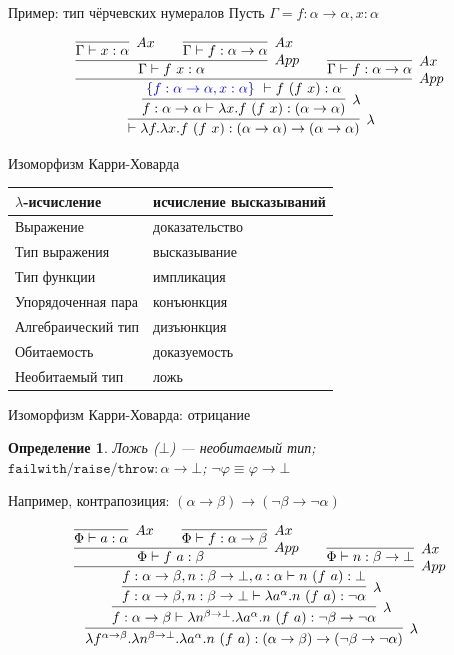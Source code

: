 \documentclass[aspectratio=169]{beamer}
\newtheorem{dfn}{Определение}[section]
\begin{document}
\begin{frame}{Пример: тип чёрчевских нумералов}
Пусть $\Gamma = f:\alpha\rightarrow\alpha, x: \alpha$

$$\infer[\lambda]{\vdash \lambda f.\lambda x.f\ (f\ x) : (\alpha\rightarrow\alpha)\rightarrow(\alpha\rightarrow\alpha)}{
  \infer[\lambda]{f: \alpha\rightarrow\alpha \vdash \lambda x.f\ (f\ x) : (\alpha\rightarrow\alpha)}{
    \infer[App]{{\color{blue}\{ f:\alpha\rightarrow\alpha, x: \alpha\}\ } \vdash f\ (f\ x): \alpha}{
      \infer[App]{\Gamma \vdash f\ x: \alpha}{
        \infer[Ax]{\Gamma \vdash x: \alpha}{}\quad\quad\infer[Ax]{\Gamma \vdash f: \alpha\rightarrow\alpha}{}
      }\quad\quad
      \infer[Ax]{\Gamma \vdash f: \alpha\rightarrow\alpha}{}
    }
  }
}$$
\end{frame}


\begin{frame}{Изоморфизм Карри-Ховарда}

\begin{tabular}{ll}
$\lambda$-исчисление & исчисление высказываний\\\hline
Выражение & доказательство\\
Тип выражения & высказывание\\
Тип функции & импликация\\
Упорядоченная пара & конъюнкция\\
Алгебраический тип & дизъюнкция\\
Обитаемость & доказуемость\\
Необитаемый тип & ложь
\end{tabular}

\end{frame}

\begin{frame}{Изоморфизм Карри-Ховарда: отрицание}

\begin{dfn}Ложь ($\bot$) --- необитаемый тип;
$\texttt{failwith/raise/throw} : \alpha\rightarrow\bot$; $\neg\varphi\equiv\varphi\rightarrow\bot$
 \end{dfn}

Например, контрапозиция:
$(\alpha\rightarrow\beta)\rightarrow(\neg\beta\rightarrow\neg\alpha)$

$$\infer[\lambda]{\lambda f^{\alpha\rightarrow\beta}.\lambda n^{\beta\rightarrow\bot}.\lambda a^\alpha.n\ (f\ a): (\alpha\rightarrow\beta)\rightarrow(\neg\beta\rightarrow\neg\alpha)}
        {\infer[\lambda]{f:\alpha\rightarrow\beta\vdash\lambda n^{\beta\rightarrow\bot}.\lambda a^\alpha.n\ (f\ a): \neg\beta\rightarrow\neg\alpha}
               {\infer[\lambda]{f:\alpha\rightarrow\beta,n:\beta\rightarrow\bot\vdash\lambda a^\alpha.n\ (f\ a): \neg\alpha}{
                       \infer[App]{f:\alpha\rightarrow\beta,n:\beta\rightarrow\bot, a:\alpha \vdash n\ (f\ a): \bot}{
                              \infer[App]{\Phi \vdash f\ a: \beta}{\infer[Ax]{\Phi \vdash a: \alpha}{}\quad\quad\infer[Ax]{\Phi \vdash f:\alpha\rightarrow\beta}{}}
    \quad\quad \infer[Ax]{\Phi \vdash n: \beta\rightarrow\bot}{}
               }
               }}}$$
\end{frame}
\end{document}
